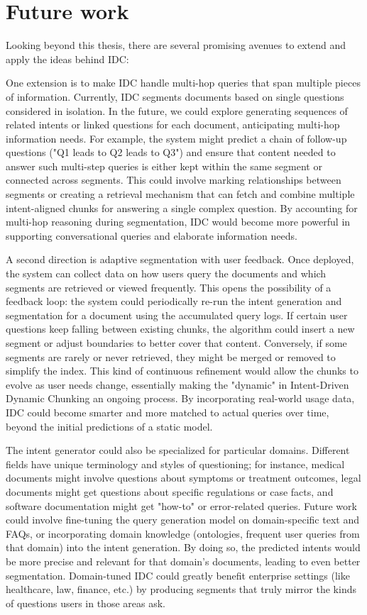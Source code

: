 \documentclass[12pt,a4paper]{report}
\begin{document}
\section{Future work}

Looking beyond this thesis, there are several promising avenues to extend and apply the ideas behind IDC:

One extension is to make IDC handle multi-hop queries that span multiple pieces of information. Currently, IDC segments documents based on single questions considered in isolation. In the future, we could explore generating sequences of related intents or linked questions for each document, anticipating multi-hop information needs. For example, the system might predict a chain of follow-up questions ("Q1 leads to Q2 leads to Q3") and ensure that content needed to answer such multi-step queries is either kept within the same segment or connected across segments. This could involve marking relationships between segments or creating a retrieval mechanism that can fetch and combine multiple intent-aligned chunks for answering a single complex question. By accounting for multi-hop reasoning during segmentation, IDC would become more powerful in supporting conversational queries and elaborate information needs.

A second direction is adaptive segmentation with user feedback. Once deployed, the system can collect data on how users query the documents and which segments are retrieved or viewed frequently. This opens the possibility of a feedback loop: the system could periodically re-run the intent generation and segmentation for a document using the accumulated query logs. If certain user questions keep falling between existing chunks, the algorithm could insert a new segment or adjust boundaries to better cover that content. Conversely, if some segments are rarely or never retrieved, they might be merged or removed to simplify the index. This kind of continuous refinement would allow the chunks to evolve as user needs change, essentially making the "dynamic" in Intent-Driven Dynamic Chunking an ongoing process. By incorporating real-world usage data, IDC could become smarter and more matched to actual queries over time, beyond the initial predictions of a static model.

The intent generator could also be specialized for particular domains. Different fields have unique terminology and styles of questioning; for instance, medical documents might involve questions about symptoms or treatment outcomes, legal documents might get questions about specific regulations or case facts, and software documentation might get "how-to" or error-related queries. Future work could involve fine-tuning the query generation model on domain-specific text and FAQs, or incorporating domain knowledge (ontologies, frequent user queries from that domain) into the intent generation. By doing so, the predicted intents would be more precise and relevant for that domain's documents, leading to even better segmentation. Domain-tuned IDC could greatly benefit enterprise settings (like healthcare, law, finance, etc.) by producing segments that truly mirror the kinds of questions users in those areas ask.
\end{document}
